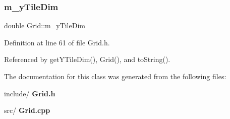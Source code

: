 \mbox{\label{class_grid_a497eeffc4a16a021e15ecbc130f4f644}} 
\subsubsection{m\+\_\+y\+Tile\+Dim}
{\footnotesize\ttfamily double Grid\+::m\+\_\+y\+Tile\+Dim\hspace{0.3cm}{\ttfamily [private]}}



Definition at line 61 of file Grid.\+h.



Referenced by get\+Y\+Tile\+Dim(), Grid(), and to\+String().



The documentation for this class was generated from the following files\+:\begin{DoxyCompactItemize}
\item 
include/\textbf{ Grid.\+h}\item 
src/\textbf{ Grid.\+cpp}\end{DoxyCompactItemize}
